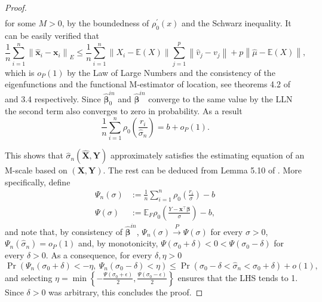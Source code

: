 \documentclass[11pt]{article}
\begin{document}
\begin{proof}
\begin{align*}
\end{align*}
for some $M>0$, by the boundedness of $\rho^{\prime}_{0}(x)$ and the Schwarz inequality. It can be easily verified that
\begin{equation}
\frac{1}{n} \sum_{i=1}^n \left\|\mathbf{\widehat{x}}_i - \mathbf{x}_i  \right\|_{E} \leq \frac{1}{n} \sum_{i=1}^n  \left\| X_i -\mathbb{E}(X) \right\| \sum_{j=1}^p \left\| \widehat{v}_j -v_j \right\| + p \left\|\widehat{\mu}-\mathbb{E}(X) \right\|,
\end{equation}
which is $o_{P}(1)$ by the Law of Large Numbers and  the consistency of the eigenfunctions and the functional M-estimator of location, see theorems 4.2 of \citep{bali2011robust} and  3.4 \citep{sinova2018m} respectively. Since $\widehat{\boldsymbol{\beta}}^{in}_0$ and  $\widehat{\boldsymbol{\beta}}^{in}$ converge to the same value by the LLN the second term also converges to zero in probability. As a result
\begin{equation}
\frac{1}{n} \sum_{i=1}^n \rho_0 \left( \frac{r_i}{\widehat{\sigma}_n} \right) = b + o_{P}(1).
\end{equation}

This shows that $\widehat{\sigma}_n \left(\widehat{\mathbf{X}}, \mathbf{Y} \right)$ approximately satisfies the estimating equation of an M-scale based on $\left(\mathbf{X}, \mathbf{Y} \right)$. The rest can be deduced from Lemma 5.10 of \citep{van1998asymptotic}. More specifically, define
\begin{align*}
\Psi_n\left(\sigma \right) & := \frac{1}{n} \sum_{i=1}^n \rho_0 \left( \frac{r_i}{\sigma}\right)-b \\
\Psi\left(\sigma \right) & := \mathbb{E}_F \rho_0 \left( \frac{Y-\mathbf{x}^{\top} \boldsymbol{\beta}}{\sigma}\right)-b,
\end{align*}
and note that, by consistency of $\boldsymbol{\widehat{\beta}}^{in}$, $\Psi_n(\sigma) \xrightarrow{P} \Psi(\sigma)$ for every $\sigma>0$, $\Psi_n(\widehat{\sigma}_n) = o_P(1)$ and, by monotonicity, $\Psi(\sigma_0+\delta)<0<\Psi(\sigma_0-\delta)$ for every $\delta>0$. As a consequence, for every $\delta, \eta >0 $
\begin{equation}
\Pr\left(\Psi_n(\sigma_0+\delta)<-\eta,\ \Psi_n(\sigma_0-\delta)<\eta \right) \leq \Pr\left(\sigma_0-\delta<\widehat{\sigma}_n<\sigma_0+\delta \right) + o(1),
\end{equation}
and selecting $\eta = \min\left\{-\frac{\Psi(\sigma_0+\epsilon)}{2}, \frac{\Psi(\sigma_0-\epsilon)}{2} \right\}$ ensures that the LHS tends to 1. Since $\delta>0$ was arbitrary, this concludes the proof.
\end{proof}
\end{document}
